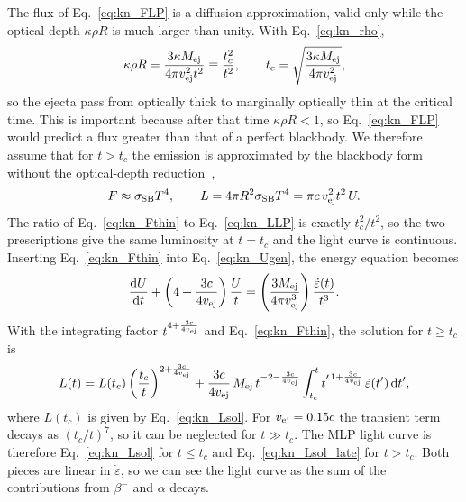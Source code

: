 The flux of Eq.~\ref{eq:kn_FLP} is a diffusion approximation, valid only while the optical depth $\kappa\rho R$ is much larger than unity.
With Eq.~\ref{eq:kn_rho},
\begin{equation}\label{eq:kn_tthin}
  \kappa\rho R=\frac{3\kappa M_{\rm ej}}{4\pi v_{\rm ej}^2t^2}\equiv\frac{t_c^2}{t^2},\qquad
  t_c=\sqrt{\frac{3\kappa M_{\rm ej}}{4\pi v_{\rm ej}^2}},
\end{equation}
so the ejecta pass from optically thick to marginally optically thin at the critical time.
This is important because after that time $\kappa\rho R<1$, so Eq.~\ref{eq:kn_FLP} would predict a flux greater than that of a perfect blackbody.
We therefore assume that for $t>t_c$ the emission is approximated by the blackbody form without the optical-depth reduction~\cite{hernandez_porras_features_2027},
\begin{equation}\label{eq:kn_Fthin}
  F\approx\sigma_{\rm SB}T^4,\qquad L=4\pi R^2\sigma_{\rm SB}T^4=\pi c\,v_{\rm ej}^2t^2\,U .
\end{equation}
The ratio of Eq.~\ref{eq:kn_Fthin} to Eq.~\ref{eq:kn_LLP} is exactly $t_c^2/t^2$, so the two prescriptions give the same luminosity at $t=t_c$ and the light curve is continuous.
Inserting Eq.~\ref{eq:kn_Fthin} into Eq.~\ref{eq:kn_Ugen}, the energy equation becomes
\begin{equation}\label{eq:kn_LPode_late}
  \frac{\mathrm{d}U}{\mathrm{d}t}+\left(4+\frac{3c}{4v_{\rm ej}}\right)\frac{U}{t}=\left(\frac{3M_{\rm ej}}{4\pi v_{\rm ej}^3}\right)\frac{\dot\varepsilon(t)}{t^3}.
\end{equation}
With the integrating factor $t^{4+\frac{3c}{4v_{\rm ej}}}$ and Eq.~\ref{eq:kn_Fthin}, the solution for $t\geq t_c$ is
\begin{equation}\label{eq:kn_Lsol_late}
  L(t)=L(t_c)\left(\frac{t_c}{t}\right)^{2+\frac{3c}{4v_{\rm ej}}}+\frac{3c}{4v_{\rm ej}}\,M_{\rm ej}\,t^{-2-\frac{3c}{4v_{\rm ej}}}\int_{t_c}^{t}t'^{\,1+\frac{3c}{4v_{\rm ej}}}\,\dot\varepsilon(t')\,\mathrm{d}t' ,
\end{equation}
where $L(t_c)$ is given by Eq.~\ref{eq:kn_Lsol}.
For $v_{\rm ej}=0.15c$ the transient term decays as $(t_c/t)^7$, so it can be neglected for $t\gg t_c$.
The MLP light curve is therefore Eq.~\ref{eq:kn_Lsol} for $t\leq t_c$ and Eq.~\ref{eq:kn_Lsol_late} for $t>t_c$.
Both pieces are linear in $\dot\varepsilon$, so we can see the light curve as the sum of the contributions from $\beta^{-}$ and $\alpha$ decays.

